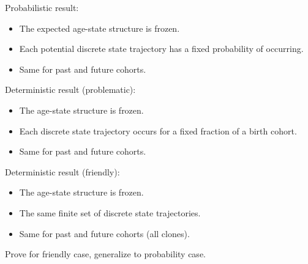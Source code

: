 \documentclass[20pt,usenames,dvipsnames]{beamer}
\begin{document}
\begin{frame}[plain]
\Large
\centering
Probabilistic result:
\begin{itemize}[<+->]
\item The expected age-state structure is frozen.
\item Each potential discrete state trajectory has a fixed probability of
occurring.
\item Same for past and future cohorts.
\end{itemize}
\end{frame}

\begin{frame}[plain]
\Large
\centering
Deterministic result (problematic):
\begin{itemize}[<+->]
\item The age-state structure is frozen.
\item Each discrete state trajectory occurs for a fixed fraction of a birth
cohort.
\item Same for past and future cohorts.
\end{itemize}
\end{frame}

\begin{frame}[plain]
\Large
\centering
Deterministic result (friendly):
\begin{itemize}[<+->]
\item The age-state structure is frozen.
\item The same finite set of discrete state trajectories.
\item Same for past and future cohorts (all clones).
\end{itemize}
\end{frame}

\begin{frame}[plain]
\Large
\centering
Prove for friendly case, generalize to probability case.
\end{frame}
\end{document}
